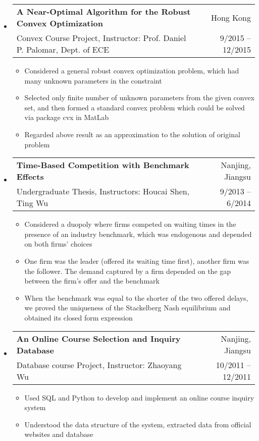 \documentclass[letterpaper,10pt]{article}
\makeatletter
\newcommand{\resitem}[1]{\item #1 \vspace{-2pt}}
\newcommand{\ressubheading}[4]{
\begin{tabular*}{6.5in}{l@{\extracolsep{\fill}}r}
    \textbf{#1} & #2 \\
    #3 & #4 \\
\end{tabular*}\vspace{-6pt}}
\makeatother
\begin{document}
\begin{itemize}


\item 
\ressubheading{A Near-Optimal Algorithm for the Robust Convex Optimization}{Hong Kong}{Convex Course Project, Instructor: Prof. Daniel P. Palomar, Dept. of ECE}{9/2015 -- 12/2015}
\begin{itemize}
\resitem{Considered a general robust convex optimization problem, which had many unknown parameters in the constraint}
\resitem{Selected only finite number of unknown parameters from the given convex set, and then formed a standard convex problem which could be solved via package cvx in MatLab}
\resitem{Regarded above result as an approximation to the solution of original problem}
\end{itemize}


\item
\ressubheading{Time-Based Competition with Benchmark Effects}{Nanjing, Jiangsu}{Undergraduate Thesis, Instructors: Houcai Shen, Ting Wu}{9/2013 -- 6/2014}
\begin{itemize}
\resitem{Considered a duopoly where firms competed on waiting times in the presence of an industry benchmark, which was endogenous and depended on both firms' choices}
\resitem{One firm was the leader (offered its waiting time first), another firm was the follower. The demand captured by a firm depended on the gap between the firm's offer and the benchmark}
\resitem{When the benchmark was equal to the shorter of the two offered delays, we proved the uniqueness of the Stackelberg Nash equilibrium and obtained its closed form expression}
\end{itemize}


\item 
\ressubheading{An Online Course Selection and Inquiry Database}{Nanjing, Jiangsu}{Database course Project, Instructor: Zhaoyang Wu}{10/2011 -- 12/2011}
\begin{itemize}
\resitem{Used SQL and Python to develop and implement an online course inquiry system}
\resitem{Understood the data structure of the system, extracted data from official websites and database}
\end{itemize}

\end{itemize}
\end{document}
